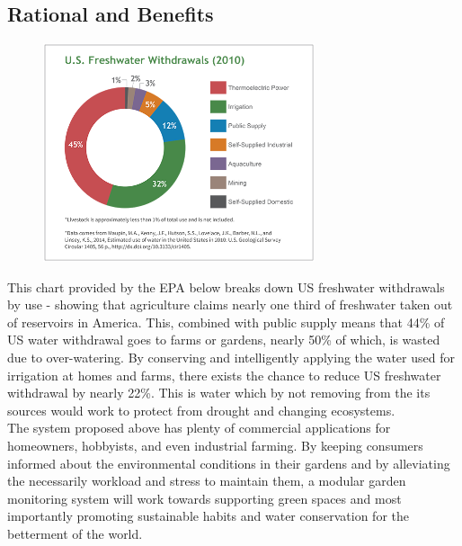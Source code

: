 \documentclass[]{article}
\begin{document}
\subsection*{Rational and Benefits}
\begin{figure}
    \vspace{-1cm}
    \centering
    \includegraphics[width=8cm]{pie.png}
\end{figure}

This chart provided by the EPA below breaks down US freshwater withdrawals by use - showing that agriculture claims nearly one third of freshwater taken out of reservoirs in America\cite{us_epa_how_2017}. This, combined with public supply means that 44\% of US water withdrawal goes to farms or gardens, nearly 50\% of which, is wasted due to over-watering\cite{epa_watersense_nodate}. By conserving and intelligently applying the water used for irrigation at homes and farms, there exists the chance to reduce US freshwater withdrawal by nearly 22\%. This is water which by not removing from the its sources would work to protect from drought and changing ecosystems.\\

The system proposed above has plenty of commercial applications for homeowners, hobbyists, and even industrial farming. By keeping consumers informed about the environmental conditions in their gardens and by alleviating the necessarily workload and stress to maintain them, a modular garden monitoring system will work towards supporting green spaces and most importantly promoting sustainable habits and water conservation for the betterment of the world.

\end{document}
